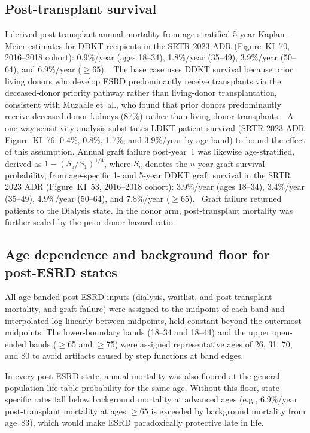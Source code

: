 \subsection{Post-transplant survival}
I derived post-transplant annual mortality from age-stratified 5-year Kaplan--Meier estimates for DDKT recipients in the SRTR 2023 ADR (Figure~KI~70, 2016--2018 cohort): 0.9\%/year (ages 18--34), 1.8\%/year (35--49), 3.9\%/year (50--64), and 6.9\%/year ($\geq 65$).~\cite{srtr_2023} The base case uses DDKT survival because prior living donors who develop ESRD predominantly receive transplants via the deceased-donor priority pathway rather than living-donor transplantation, consistent with Muzaale et~al., who found that prior donors predominantly receive deceased-donor kidneys (87\%) rather than living-donor transplants.~\cite{muzaale2016outcomes} A one-way sensitivity analysis substitutes LDKT patient survival (SRTR 2023 ADR Figure~KI~76: 0.4\%, 0.8\%, 1.7\%, and 3.9\%/year by age band) to bound the effect of this assumption. Annual graft failure post-year~1 was likewise age-stratified, derived as $1-(S_5/S_1)^{1/4}$, where $S_n$ denotes the $n$-year graft survival probability, from age-specific 1- and 5-year DDKT graft survival in the SRTR 2023 ADR (Figure~KI~53, 2016--2018 cohort): 3.9\%/year (ages 18--34), 3.4\%/year (35--49), 4.9\%/year (50--64), and 7.8\%/year ($\geq 65$).~\cite{srtr_2023} Graft failure returned patients to the Dialysis state. In the donor arm, post-transplant mortality was further scaled by the prior-donor hazard ratio.

\subsection{Age dependence and background floor for post-ESRD states}
All age-banded post-ESRD inputs (dialysis, waitlist, and post-transplant mortality, and graft failure) were assigned to the midpoint of each band and interpolated log-linearly between midpoints, held constant beyond the outermost midpoints. The lower-boundary bands (18--34 and 18--44) and the upper open-ended bands ($\geq$65 and $\geq$75) were assigned representative ages of 26, 31, 70, and 80 to avoid artifacts caused by step functions at band edges. %

In every post-ESRD state, annual mortality was also floored at the general-population life-table probability for the same age. Without this floor, state-specific rates fall below background mortality at advanced ages (e.g., 6.9\%/year post-transplant mortality at ages $\geq 65$ is exceeded by background mortality from age~83), which would make ESRD paradoxically protective late in life.

